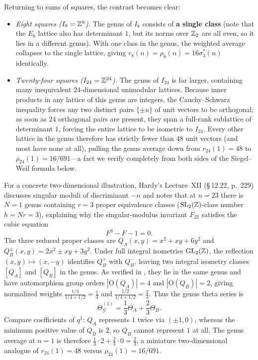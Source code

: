 Returning to sums of squares, the contrast becomes clear:
\begin{itemize}
\item \emph{Eight squares ($I_8=\mathbb{Z}^8$).} The genus of $I_8$ consists of \textbf{a single class} (note that the $E_8$ lattice also has determinant $1$, but its norms over $\mathbb{Z}_2$ are all even, so it lies in a different genus). With one class in the genus, the weighted average collapses to the single lattice, giving $r_8(n)=\rho_8(n)=16\sigma_3^*(n)$ identically.
\item \emph{Twenty-four squares ($I_{24}=\mathbb{Z}^{24}$).} The genus of $I_{24}$ is far larger, containing many inequivalent $24$-dimensional unimodular lattices. Because inner products in any lattice of this genus are integers, the Cauchy--Schwarz inequality forces any two distinct pairs $\{\pm u\}$ of unit vectors to be orthogonal; as soon as $24$ orthogonal pairs are present, they span a full-rank sublattice of determinant $1$, forcing the entire lattice to be isometric to $I_{24}$. Every other lattice in the genus therefore has strictly fewer than $48$ unit vectors (and most have none at all), pulling the genus average down from $r_{24}(1)=48$ to $\rho_{24}(1)=16/691$---a fact we verify completely from both sides of the Siegel--Weil formula below.
\end{itemize}

For a concrete two-dimensional illustration, Hardy's Lecture~XII (\S\,12.22, p.~229) discusses singular moduli of discriminant $-n$ and notes that at $n=23$ there is $N=1$ genus containing $r=3$ proper equivalence classes ($\operatorname{SL}_2(\mathbb{Z})$-class number $h=Nr=3$), explaining why the singular-modulus invariant $F_{23}$ satisfies the cubic equation
\[
F^3-F-1=0.
\]
The three reduced proper classes are $Q_A(x,y)=x^2+xy+6y^2$ and $Q_B^\pm(x,y)=2x^2\pm xy+3y^2$. Under full integral isometries $\operatorname{GL}_2(\mathbb{Z})$, the reflection $(x,y)\mapsto(x,-y)$ identifies $Q_B^+$ with $Q_B^-$, leaving two integral isometry classes $[Q_A]$ and $[Q_B]$ in the genus. As verified in , they lie in the same genus and have automorphism group orders $|\mathrm O(Q_A)|=4$ and $|\mathrm O(Q_B)|=2$, giving normalized weights $\frac{1/4}{1/4+1/2}=\frac{1}{3}$ and $\frac{1/2}{1/4+1/2}=\frac{2}{3}$. Thus the genus theta series is
\[
\overline{\Theta}_{\mathcal G}^{(1)}=\frac{1}{3}\Theta_A+\frac{2}{3}\Theta_B.
\]
Compare coefficients of $q^1$: $Q_A$ represents $1$ twice via $(\pm 1,0)$, whereas the minimum positive value of $Q_B$ is $2$, so $Q_B$ cannot represent $1$ at all. The genus average at $n=1$ is therefore $\frac{1}{3}\cdot 2+\frac{2}{3}\cdot 0=\frac{2}{3}$, a miniature two-dimensional analogue of $r_{24}(1)=48$ versus $\rho_{24}(1)=16/691$.

